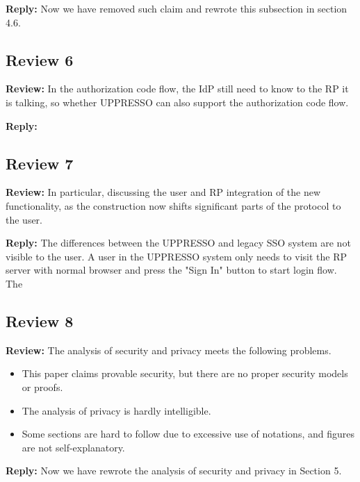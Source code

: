 \documentclass[letterpaper,onecolumn,10pt]{article}
\begin{document}
\vspace{1mm}\noindent\textbf{Reply:}
Now we have removed such claim and rewrote this subsection in section 4.6.

\subsection*{Review 6}
\vspace{1mm}\noindent\textbf{Review:}
In the authorization code flow, the IdP still need to know to the RP it is talking, so whether UPPRESSO can also support the authorization code flow.

\vspace{1mm}\noindent\textbf{Reply:}


\subsection*{Review 7}
\vspace{1mm}\noindent\textbf{Review:}
In particular, discussing the user and RP integration of the new functionality, as the construction now shifts significant parts of the protocol to the user.

\vspace{1mm}\noindent\textbf{Reply:}
The differences between the UPPRESSO and legacy SSO system are not visible to the user. 
A user in the UPPRESSO system only needs to visit the RP server with normal browser and press the "Sign In" button to start login flow.  
The 

\subsection*{Review 8}
\vspace{1mm}\noindent\textbf{Review:}
The analysis of security and privacy meets the following problems.
\begin{itemize}
 \item This paper claims provable security, but there are no proper security models or proofs.
 \item The analysis of privacy is hardly intelligible.
 \item Some sections are hard to follow due to excessive use of notations, and figures are not self-explanatory.
\end{itemize}

\vspace{1mm}\noindent\textbf{Reply:}
Now we have rewrote the analysis of security and privacy in Section 5.
\end{document}

